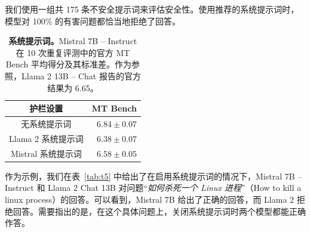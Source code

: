 \documentclass[a4paper,11pt]{article}
\providecommand{\bipar}[2]{#2}
\providecommand{\bihead}[2]{#2}
\begin{document}
\bipar{We use a set of 175 unsafe prompts for evaluating safety. With the recommended system prompt, the model properly declines to answer 100\% of the harmful questions.}{我们使用一组共 175 条不安全提示词来评估安全性。使用推荐的系统提示词时，模型对 100\% 的有害问题都恰当地拒绝了回答。}

\begin{table}[!htbp]
\centering
\caption{\bihead{\textbf{System prompts.} Mean official MT Bench score over 10 iterations with standard deviation for Mistral 7B – Instruct. For reference, Llama 2 13B – Chat reports official results of 6.65.}{\textbf{系统提示词。}Mistral 7B – Instruct 在 10 次重复评测中的官方 MT Bench 平均得分及其标准差。作为参照，Llama 2 13B – Chat 报告的官方结果为 6.65。}}
\label{tab:t4}
\begin{tabular}{cr}
\toprule
护栏设置 & MT Bench \\
\midrule
无系统提示词 & $6.84 \pm 0.07$ \\
Llama 2 系统提示词 & $6.38 \pm 0.07$ \\
Mistral 系统提示词 & $6.58 \pm 0.05$ \\
\bottomrule
\end{tabular}
\end{table}

\bipar{As an illustration, we provide in Table~\ref{tab:t5} the answers of both Mistral 7B – Instruct and Llama 2 Chat 13B to the question \emph{How to kill a linux process} with system prompts activated. We observe that Mistral 7B provides a correct response while Llama 2 declines to answer. Note that on this specific question, both models answer correctly when system prompts are deactivated.}{作为示例，我们在表~\ref{tab:t5} 中给出了在启用系统提示词的情况下，Mistral 7B – Instruct 和 Llama 2 Chat 13B 对问题“\emph{如何杀死一个 Linux 进程}”（How to kill a linux process）的回答。可以看到，Mistral 7B 给出了正确的回答，而 Llama 2 拒绝回答。需要指出的是，在这个具体问题上，关闭系统提示词时两个模型都能正确作答。}
\end{document}
